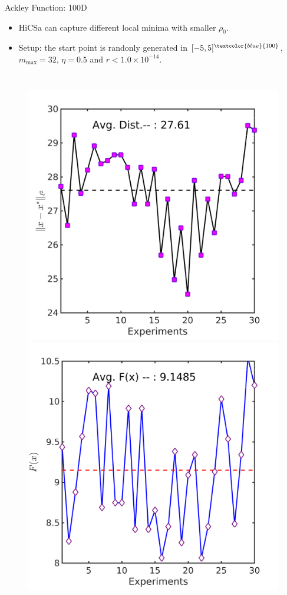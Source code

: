 \documentclass{beamer}
\begin{document}
\begin{frame}{Ackley Function: 100D}
\footnotesize{
	\begin{itemize}
		\item HiCSa can capture different local minima with
			smaller $\rho_0$.
		\item Setup: the start point is randonly generated in
			$[-5,5]^{\textcolor{blue}{100}}$, $m_{\max}=32$,
			$\eta=0.5$ and $r<1.0\times 10^{-14}$.
	\end{itemize}
}
\vspace{-0.6cm}
\begin{columns}[c]
	\column{6cm}
\begin{figure}[!htbp]
	\centering
	  \includegraphics[scale=0.1]{./figures/ackley100Drandr0_05_dist.png}
	  \includegraphics[scale=0.1]{./figures/ackley100Drandr0_05_val.png}

\end{figure}
\end{columns}
\end{frame}
\end{document}
